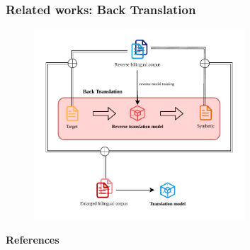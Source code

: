 \documentclass[]{beamer} %
\newcommand{\backupend}{
    \addtocounter{framenumberappendix}{-\value{framenumber}}
    \addtocounter{framenumber}{\value{framenumberappendix}} 
}
\begin{document}
\section{}
\frame
{\frametitle{\textbf{Related works: Back Translation}}

\begin{figure}
  \centering
  \includegraphics[width=0.7\textwidth, keepaspectratio]{figure/BT/backtranslation.pdf}
  \caption{\citep{sennrich-etal-2016-improving}}
\end{figure} 
 } 

\begin{frame}[allowframebreaks]{\textbf{References}}

\renewcommand{\bibname}{References}
\small



\end{frame}


\backupend
\end{document}

